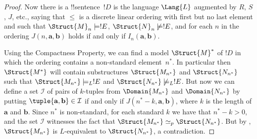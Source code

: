 \documentclass[../../include/open-logic-section]{subfiles}
\begin{document}
\begin{proof}
Now there is a !!{sentence}~$!D$ is the language $\Lang{L}$ augmented
by $R$, $S$, $J$, etc., saying that $\le$ is a discrete linear ordering
with first but no last element and such that $\Struct{M}_n \models
!E$, $\Struct{N}_n \not\models !E$, and for each $n$ in the
ordering $J(n, \mathbf{a}, \mathbf{b})$ holds if and only if
$I_n(\mathbf{a}, \mathbf{b})$.

Using the Compactness Property, we can find a model $\Struct{M}^*$ of
$!D$ in which the ordering contains a non-standard element~$n^*$. In
particular then $\Struct{M^*}$ will contain substructures
$\Struct{M_{n^*}}$ and $\Struct{N_{n^*}}$ such that $\Struct{M_{n^*}}
\models_L !E$ and $\Struct{N_{n^*}} \not\models_L !E$. But now we can
define a set $\mathcal{I}$ of pairs of $k$-tuples from
$\Domain{M_{n^*}}$ and $\Domain{N_{n^*}}$ by putting
$\tuple{\mathbf{a}, \mathbf{b}} \in \mathcal{I}$ if and only if
$J(n^*-k, \mathbf{a}, \mathbf{b})$, where $k$ is the length of
$\mathbf{a}$ and $\mathbf{b}$. Since $n^*$ is non-standard, for each
standard $k$ we have that $n^* - k >0$, and the set $\mathcal{I}$
witnesses the fact that $\Struct{M_{n^*}} \simeq_p
\Struct{N_{n^*}}$. But by ,
$\Struct{M_{n^*}}$ is $L$-equivalent to $\Struct{N_{n^*}}$, a
contradiction.
\end{proof}
\end{document}
